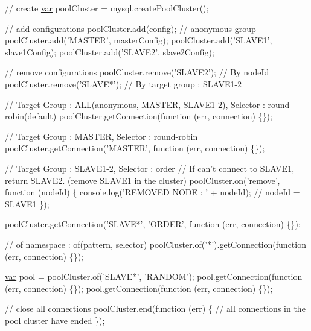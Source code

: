 \begin{DoxyCode}
\textcolor{comment}{// create}
\hyperlink{018__def_8c_a335628f2e9085305224b4f9cc6e95ed5}{var} poolCluster = mysql.createPoolCluster();

\textcolor{comment}{// add configurations}
poolCluster.add(config); \textcolor{comment}{// anonymous group}
poolCluster.add(\textcolor{stringliteral}{'MASTER'}, masterConfig);
poolCluster.add(\textcolor{stringliteral}{'SLAVE1'}, slave1Config);
poolCluster.add(\textcolor{stringliteral}{'SLAVE2'}, slave2Config);

\textcolor{comment}{// remove configurations}
poolCluster.remove(\textcolor{stringliteral}{'SLAVE2'}); \textcolor{comment}{// By nodeId}
poolCluster.remove(\textcolor{stringliteral}{'SLAVE*'}); \textcolor{comment}{// By target group : SLAVE1-2}

\textcolor{comment}{// Target Group : ALL(anonymous, MASTER, SLAVE1-2), Selector : round-robin(default)}
poolCluster.getConnection(\textcolor{keyword}{function} (err, connection) \{\});

\textcolor{comment}{// Target Group : MASTER, Selector : round-robin}
poolCluster.getConnection(\textcolor{stringliteral}{'MASTER'}, \textcolor{keyword}{function} (err, connection) \{\});

\textcolor{comment}{// Target Group : SLAVE1-2, Selector : order}
\textcolor{comment}{// If can't connect to SLAVE1, return SLAVE2. (remove SLAVE1 in the cluster)}
poolCluster.on(\textcolor{stringliteral}{'remove'}, \textcolor{keyword}{function} (nodeId) \{
  console.log(\textcolor{stringliteral}{'REMOVED NODE : '} + nodeId); \textcolor{comment}{// nodeId = SLAVE1 }
\});

poolCluster.getConnection(\textcolor{stringliteral}{'SLAVE*'}, \textcolor{stringliteral}{'ORDER'}, \textcolor{keyword}{function} (err, connection) \{\});

\textcolor{comment}{// of namespace : of(pattern, selector)}
poolCluster.of(\textcolor{charliteral}{'*'}).getConnection(\textcolor{keyword}{function} (err, connection) \{\});

\hyperlink{018__def_8c_a335628f2e9085305224b4f9cc6e95ed5}{var} pool = poolCluster.of(\textcolor{stringliteral}{'SLAVE*'}, \textcolor{stringliteral}{'RANDOM'});
pool.getConnection(\textcolor{keyword}{function} (err, connection) \{\});
pool.getConnection(\textcolor{keyword}{function} (err, connection) \{\});

\textcolor{comment}{// close all connections}
poolCluster.end(\textcolor{keyword}{function} (err) \{
  \textcolor{comment}{// all connections in the pool cluster have ended}
\});
\end{DoxyCode}


